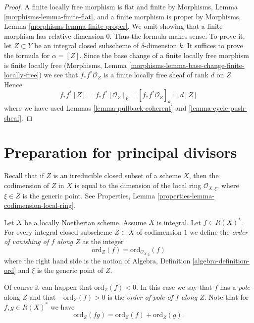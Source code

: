 \begin{proof}
A finite locally free morphism is flat and finite by
Morphisms, Lemma \ref{morphisms-lemma-finite-flat},
and a finite morphism is proper
by Morphisms, Lemma \ref{morphisms-lemma-finite-proper}.
We omit showing that a finite
morphism has relative dimension $0$. Thus the formula makes sense.
To prove it, let $Z \subset Y$ be an integral closed subscheme
of $\delta$-dimension $k$. It suffices to prove the formula
for $\alpha = [Z]$. Since the base change of a finite locally free
morphism is finite locally free
(Morphisms, Lemma \ref{morphisms-lemma-base-change-finite-locally-free})
we see that $f_*f^*\mathcal{O}_Z$ is a finite locally free sheaf of
rank $d$ on $Z$. Hence
$$
f_*f^*[Z] = f_*f^*[\mathcal{O}_Z]_k =
[f_*f^*\mathcal{O}_Z]_k = d[Z]
$$
where we have used Lemmas \ref{lemma-pullback-coherent} and
\ref{lemma-cycle-push-sheaf}.
\end{proof}








\section{Preparation for principal divisors}
\label{section-preparation-principal-divisors}

\noindent
Recall that if $Z$ is an irreducible closed subset of a scheme $X$,
then the codimension of $Z$ in $X$ is equal to the dimension
of the local ring $\mathcal{O}_{X, \xi}$, where $\xi \in Z$
is the generic point. See
Properties, Lemma \ref{properties-lemma-codimension-local-ring}.

\begin{definition}
\label{definition-order-vanishing}
Let $X$ be a locally Noetherian scheme. Assume $X$ is integral.
Let $f \in R(X)^*$. For every integral closed subscheme
$Z \subset X$ of codimension $1$ we define
the {\it order of vanishing of $f$ along $Z$} as the integer
$$
\text{ord}_Z(f) = \text{ord}_{\mathcal{O}_{X, \xi}}(f)
$$
where the right hand side is the notion of
Algebra, Definition \ref{algebra-definition-ord}
and $\xi$ is the generic point of $Z$.
\end{definition}

\noindent
Of course it can happen that $\text{ord}_Z(f) < 0$.
In this case we say that $f$ has a {\it pole} along $Z$
and that $-\text{ord}_Z(f) > 0$ is the {\it order of pole of
$f$ along $Z$}. Note that for $f, g \in R(X)^*$ we have
$$
\text{ord}_Z(fg) = \text{ord}_Z(f) + \text{ord}_Z(g).
$$

